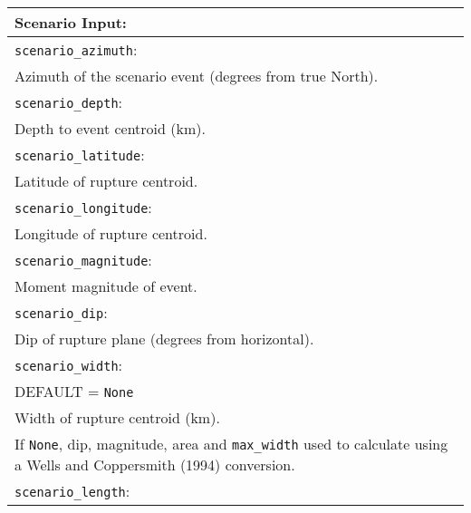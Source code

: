 \vspace{2em}
\begin{tabular}{|p{\textwidth}|}
\hline
\vspace{0.3em} \noindent \Large \textbf{Scenario Input:} \normalsize \\
\hline \vspace{0.1em} \texttt{scenario\_azimuth}: \\
Azimuth of the scenario event (degrees from true North).   \\
\hline \vspace{0.1em} \texttt{scenario\_depth}: \\
Depth to event centroid (km).    \\
\hline \vspace{0.1em} \texttt{scenario\_latitude}: \\
Latitude of rupture centroid. \\
\hline \vspace{0.1em} \texttt{scenario\_longitude}: \\
Longitude of rupture centroid.    \\
\hline \vspace{0.1em} \texttt{scenario\_magnitude}: \\
 Moment magnitude of event.    \\
\hline \vspace{0.1em} \texttt{scenario\_dip}: \\
Dip of rupture plane (degrees from horizontal).  \\
\hline \vspace{0.1em} \texttt{scenario\_width}: \\
DEFAULT = \texttt{None} \\
Width of rupture centroid (km). \\
If \texttt{None}, dip, magnitude, area and \texttt{max\_width} used to calculate 
using a Wells and Coppersmith (1994) conversion. \\
\hline \vspace{0.1em} \texttt{scenario\_length}: \\

\end{tabular}
